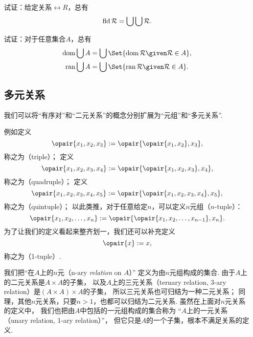 \begin{example}
试证：给定关系\(\rel{R}\)，总有\begin{equation*}
	\operatorname{fld} \mathcal{R} = \bigcup\bigcup \mathcal{R}.
\end{equation*}
\end{example}

\begin{example}
试证：对于任意集合\(A\)，总有\begin{gather}
	\dom\bigcup A = \bigcup\Set{ \dom\rel{R} \given \rel{R} \in A }, \\
	\ran\bigcup A = \bigcup\Set{ \ran\rel{R} \given \rel{R} \in A }.
\end{gather}
\end{example}

\subsection{多元关系}
我们可以将“有序对”和“二元关系”的概念分别扩展为“元组”和“多元关系”.

例如定义\begin{equation*}
	\opair{x_1,x_2,x_3}
	\defeq
	\opair{\opair{x_1,x_2},x_3},
\end{equation*}
称之为（triple）；
定义\begin{equation*}
	\opair{x_1,x_2,x_3,x_4}
	\defeq
	\opair{\opair{x_1,x_2,x_3},x_4},
\end{equation*}
称之为（quadruple）；
定义\begin{equation*}
	\opair{x_1,x_2,x_3,x_4,x_5}
	\defeq
	\opair{\opair{x_1,x_2,x_3,x_4},x_5},
\end{equation*}
称之为（quintuple）；
以此类推，对于任意给定\(n\)，可以定义\(n\)元组（\(n\)-tuple）：\begin{equation*}
	\opair{x_1,x_2,\dotsc,x_n}
	\defeq
	\opair{\opair{x_1,x_2,\dotsc,x_{n-1}},x_n}.
\end{equation*}
为了让我们的定义看起来整齐划一，我们还可以补充定义\begin{equation*}
	\opair{x} \defeq x,
\end{equation*}
称之为（1-tuple）.

我们把“在\(A\)上的\(n\)元（n-ary \emph{relation} on \(A\)）”
定义为由\(n\)元组构成的集合.
由于\(A\)上的二元关系是\(A \times A\)的子集，
以及\(A\)上的三元关系（ternary relation, 3-ary relation）是\((A \times A) \times A\)的子集，
所以三元关系也可归结为一种二元关系；
同理，其他\(n\)元关系，只要\(n>1\)，也都可以归结为二元关系.
虽然在上面对\(n\)元关系的定义中，
我们也把由\(A\)中包括的一元组构成的集合称为
“\(A\)上的一元关系（unary relation, 1-ary relation）”，
但它只是\(A\)的一个子集，根本不满足关系的定义.
